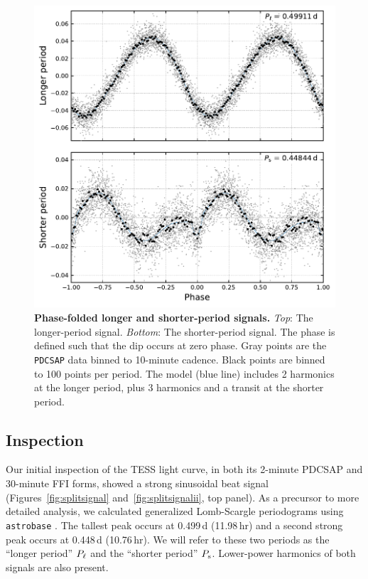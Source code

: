 \documentclass[12pt,twocolumn,tighten]{aastex62}
\begin{document}
\begin{figure}[t]
	\begin{center}
		\leavevmode
		\includegraphics[width=1\textwidth]{f3.pdf}
	\end{center}
	\vspace{-0.7cm}
	\caption{ {\bf Phase-folded longer and shorter-period signals.}
    {\it Top}: The longer-period signal.  {\it Bottom}: The
    shorter-period signal. The phase is defined such that the dip
    occurs at zero phase.  Gray points are the \texttt{PDCSAP} data
    binned to 10-minute cadence.  Black points are binned to 100
    points per period.  The model (blue line) includes 2 harmonics at
    the longer period, plus 3 harmonics and a transit at the shorter
    period.
		\label{fig:phasefold}
	}
\end{figure}

\subsection{Inspection}

Our initial inspection of the TESS light curve, in both its 2-minute
PDCSAP and 30-minute FFI forms, showed a strong sinusoidal beat signal
(Figures~\ref{fig:splitsignal} and~\ref{fig:splitsignalii}, top
panel). As a precursor to more detailed analysis, we calculated
generalized Lomb-Scargle periodograms using \texttt{astrobase}
\citep{lomb_1976,scargle_studies_1982,vanderplas_periodograms_2015,bhatti_astrobase_2018}.
The tallest peak occurs at 0.499\,d (11.98$\,$hr) and a second strong
peak occurs at 0.448\,d (10.76$\,$hr). We will refer to these two
periods as the ``longer period'' $P_{\rm \ell}$ and the ``shorter
period'' $P_{\rm s}$.  Lower-power harmonics of both signals are also
present.
\end{document}
